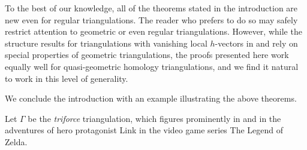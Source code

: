 \documentclass[ALCO, Unicode,published]{cedram}
\begin{document}
\begin{remark}
To the best of our knowledge, all of the theorems stated in the introduction are new even for regular triangulations. The reader who prefers to do so may safely restrict attention to geometric or even regular triangulations.  However, while the structure results for triangulations with vanishing local $h$-vectors in \cite{dMGPSS20} and \cite{LarsonPayneStapledon} rely on special properties of geometric triangulations, the proofs presented here work equally well for quasi-geometric homology triangulations, and we find it  natural to work in this level of generality.
\end{remark}

We conclude the introduction with an example illustrating the above theorems.

\begin{example} \label{ex:triforce}
Let $\Gamma$ be the \emph{triforce} triangulation, which figures prominently in \cite{dMGPSS20} and in the adventures of hero protagonist Link in the video game series The Legend of Zelda. 

\begin{center}
\end{center}



\end{example}
\end{document}
